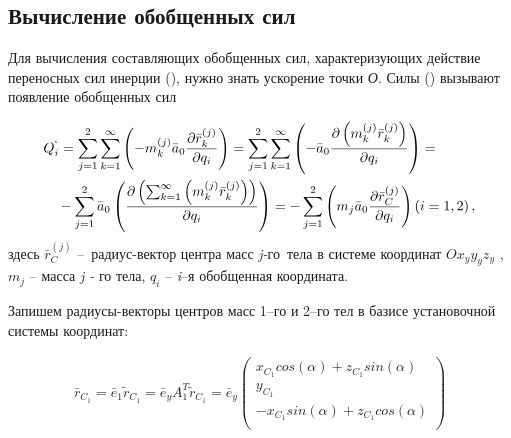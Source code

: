 \subsection{Вычисление обобщенных сил} \label{sec:ch3/sec7}

Для вычисления составляющих обобщенных сил, характеризующих действие переносных сил инерции (), нужно знать ускорение точки \textit{О}. Силы () вызывают появление обобщенных сил\par

\begin{equation} %
\label{eq:p3:29}
\begin{multlined}
Q_{i}^{`}= 
\sum _{j=1}^{2} \sum _{k=1}^{\infty} \left( -m_{k}^{ \left( j \right) }\bar{a}_{0} \frac{ \partial \bar{r}_{k}^{ \left( j \right) }}{ \partial q_{i}} \right) = 
\sum _{j=1}^{2} \sum _{k=1}^{\infty} \left( -\bar{a}_{0} \frac{ \partial  \left( m_{k}^{ \left( j \right) }\bar{r}_{k}^{ \left( j \right) } \right) }{ \partial q_{i}} \right) = \\
- \sum _{j=1}^{2}\bar{a}_{0}  \left( \frac{ \partial  \left(  \sum _{k=1}^{\infty} \left( m_{k}^{ \left( j \right) }\bar{r}_{k}^{ \left( j \right) } \right)  \right) }{ \partial q_{i}} \right) =
- \sum _{j=1}^{2} \left( m_{j}\bar{a}_{0} \frac{ \partial \bar{r}_{C}^{ \left( j \right) }}{ \partial q_{i}} \right)  \left( i=1,2 \right) ,
\end{multlined}
\end{equation}
здесь  \( \bar{r}_{C}^{ \left( j \right) } \) –\ радиус-вектор центра масс  \textit{j-}го\  тела в системе координат  \( Ox_{y}y_{y}z_{y} \) ,  \( m_{j} \) – масса \textit{j - }го тела,  \( q_{i} \) – \textit{i}–я обобщенная координата. \par

Запишем радиусы-векторы центров масс 1–го и 2–го тел в базисе установочной системы координат: \par


\begin{equation} %
\label{eq:p3:30}
\begin{multlined}
\bar{r}_{C_{1}}=\bar{e}_{1}\tilde{r}_{C_{1}}=\bar{e}_{y}A_{1}^{T}\tilde{r}_{C_{1}}=\bar{e}_{y} \left( \begin{matrix}
x_{C_{1}}cos \left(  \alpha  \right) +z_{C_{1}}sin \left(  \alpha  \right) \\
y_{C_{1}}\\
-x_{C_{1}}sin \left(  \alpha  \right) +z_{C_{1}}cos \left(  \alpha  \right) \\
\end{matrix}
\right) 
\end{multlined}
\end{equation}

